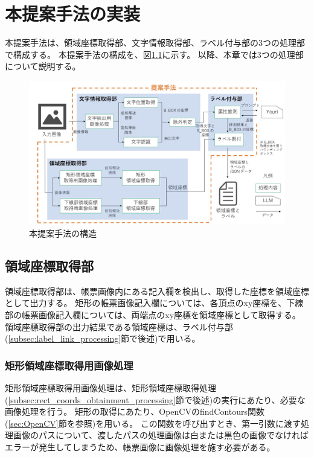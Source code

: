 \chapter{本提案手法の実装}\label{cha:Implementation}
本提案手法は、領域座標取得部、文字情報取得部、ラベル付与部の3つの処理部で構成する。
本提案手法の構成を、図\ref{fig:structure}に示す。
以降、本章では3つの処理部について説明する。

\begin{figure}[t]
    \begin{center}
        \includegraphics[width=15cm]{image/structure.jpg}
        \caption{本提案手法の構造}
        \label{fig:structure}
    \end{center}
\end{figure}


\section{領域座標取得部}\label{sec:area_coords_obtainment_part}
領域座標取得部は、帳票画像内にある記入欄を検出し、取得した座標を領域座標として出力する。
矩形の帳票画像記入欄については、各頂点のxy座標を、下線部の帳票画像記入欄については、両端点のxy座標を領域座標として取得する。
領域座標取得部の出力結果である領域座標は、ラベル付与部(\ref{subsec:label_link_processing}節で後述)で用いる。

\subsection{矩形領域座標取得用画像処理}\label{subsec:image_processing_for_rect_coords_obtainment}
矩形領域座標取得用画像処理は、矩形領域座標取得処理(\ref{subsec:rect_coords_obtainment_processing}節で後述)の実行にあたり、必要な画像処理を行う。
矩形の取得にあたり、OpenCVのfindContours関数(\ref{sec:OpenCV}節を参照)を用いる。
この関数を呼び出すとき、第一引数に渡す処理画像のパスについて、渡したパスの処理画像は白または黒色の画像でなければエラーが発生してしまうため、帳票画像に画像処理を施す必要がある。

